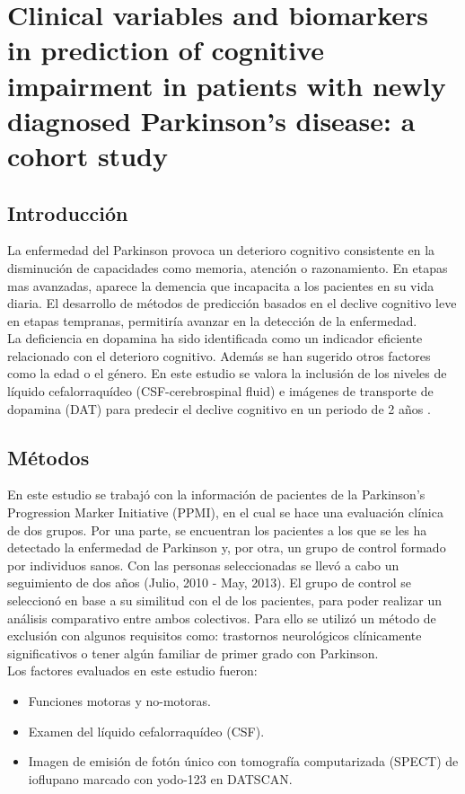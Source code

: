 \section{Clinical variables and biomarkers in prediction of cognitive impairment in patients with newly diagnosed Parkinson’s disease: a cohort study}


\subsection{Introducción}

La enfermedad del Parkinson provoca un deterioro cognitivo consistente en la disminución de capacidades como memoria, atención o razonamiento. En etapas mas avanzadas, aparece la demencia que incapacita a los pacientes en su vida diaria. El desarrollo de métodos de predicción basados en el declive cognitivo leve en etapas tempranas, permitiría avanzar en la detección de la enfermedad. \\


La deficiencia en dopamina ha sido identificada como un indicador eficiente relacionado con el deterioro cognitivo. Además se han sugerido otros factores como la edad o el género. En este estudio se valora la inclusión de los niveles de líquido cefalorraquídeo (CSF-cerebrospinal fluid) e imágenes de transporte de dopamina (DAT) para predecir el declive cognitivo en un periodo de 2 años \cite{schrag2017clinical}.

\subsection{Métodos}
En este estudio se trabajó con la información de pacientes de la Parkinson’s Progression Marker Initiative (PPMI), en el cual se hace una evaluación clínica de dos grupos. Por una parte, se encuentran los pacientes a los que se les ha detectado la enfermedad de Parkinson y, por otra, un grupo de control formado por individuos sanos. Con las personas seleccionadas se llevó a cabo un seguimiento de dos años (Julio, 2010 - May, 2013). El grupo de control se seleccionó en base a su similitud con el de los pacientes, para poder realizar un análisis comparativo entre ambos colectivos. Para ello se utilizó un método de exclusión con algunos requisitos como: trastornos neurológicos clínicamente significativos o tener algún familiar de primer grado con Parkinson.\\

Los factores evaluados en este estudio fueron: 
\begin{itemize}
	\item Funciones motoras y no-motoras.
	\item Examen del líquido cefalorraquídeo (CSF).
	\item Imagen de emisión de fotón único con tomografía computarizada (SPECT) de ioflupano marcado con yodo-123 en DATSCAN.
\end{itemize}


